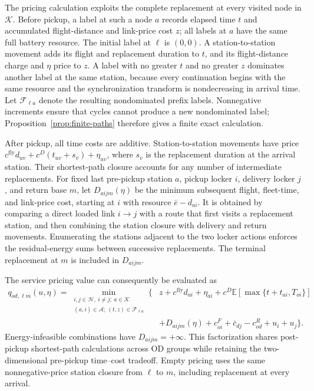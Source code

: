 \documentclass[final,3p,authoryear]{elsarticle}
\begin{document}
The pricing calculation exploits the complete replacement at every visited node in $\mathcal K$.
Before pickup, a label at such a node $a$ records elapsed time $t$ and accumulated flight-distance and link-price cost $z$; all labels at $a$ have the same full battery resource.
The initial label at $\ell$ is $(0,0)$.
A station-to-station movement adds its flight and replacement duration to $t$, and its flight-distance charge and $\eta$ price to $z$.
A label with no greater $t$ and no greater $z$ dominates another label at the same station, because every continuation begins with the same resource and the synchronization transform is nondecreasing in arrival time.
Let $\mathcal F_{\ell a}$ denote the resulting nondominated prefix labels.
Nonnegative increments ensure that cycles cannot produce a new nondominated label; Proposition~\ref{prop:finite-paths} therefore gives a finite exact calculation.

After pickup, all time costs are additive.
Station-to-station movements have price $c^{\mathrm{fly}}d_{uv}+c^D(t_{uv}+s_v)+\eta_{uv}$, where $s_v$ is the replacement duration at the arrival station.
Their shortest-path closure accounts for any number of intermediate replacements.
For fixed last pre-pickup station $a$, pickup locker $i$, delivery locker $j$, and return base $m$, let $D_{aijm}(\eta)$ be the minimum subsequent flight, fleet-time, and link-price cost, starting at $i$ with resource $\bar e-d_{ai}$.
It is obtained by comparing a direct loaded link $i\to j$ with a route that first visits a replacement station, and then combining the station closure with delivery and return movements.
Enumerating the stations adjacent to the two locker actions enforces the residual-energy sums between successive replacements.
The terminal replacement at $m$ is included in $D_{aijm}$.

The service pricing value can consequently be evaluated as
\begin{equation}
\begin{aligned}
 q_{od,\ell m}(u,\eta)=
 \min_{\substack{i,j\in\mathcal H,\ i\ne j;\ a\in\mathcal K\\
                 (a,i)\in\mathcal A;\ (t,z)\in\mathcal F_{\ell a}}}
 \bigl\{&z+c^{\mathrm{fly}}d_{ai}+\eta_{ai}
       +c^D\mathbb E[\max\{t+t_{ai},T_{oi}\}]\\
       &+D_{aijm}(\eta)+c_{oi}^F+\bar c_{dj}-c_{od}^R+u_i+u_j\bigr\}.
\end{aligned}
\label{eq:pricing-factorization}
\end{equation}
Energy-infeasible combinations have $D_{aijm}=+\infty$.
This factorization shares post-pickup shortest-path calculations across OD groups while retaining the two-dimensional pre-pickup time--cost tradeoff.
Empty pricing uses the same nonnegative-price station closure from $\ell$ to $m$, including replacement at every arrival.
\end{document}

